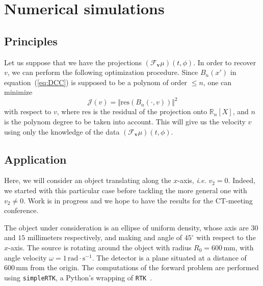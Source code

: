 \documentclass[twocolumn]{IEEEtran}
\numberwithin{equation}{section}
\newcommand{\R}{\mathbb{R}}
\newcommand{\ie}{\emph{i.e.} }
\newcommand{\Tbv}{\mathcal{F}_{\mathbf{v}}}
\begin{document}
\section{Numerical simulations}

\subsection{Principles}
\label{sub:principles}
Let us suppose that we have the projections $\left( \Tbv \mu \right)(t,\phi)$. In order to recover $v$, we can perform the following optimization procedure. Since $B_n(x')$ in equation~(\ref{eq:DCC}) is supposed to be a polynom of order $\leq n$, one can minimize
\begin{equation}
	\mathcal{J}(v) = \Vert \textrm{res} \left( B_n(\cdot,v) \right) \Vert^2
\label{eq:Jv}
\end{equation}
with respect to $v$, where $\textrm{res}$ is the residual of the projection onto $\R_n[X]$, and $n$ is the polynom degree to be taken into account. This will give us the velocity $v$ using only the knowledge of the data $\left( \Tbv \mu \right)(t,\phi)$.

\subsection{Application}
\label{sub:application}
Here, we will consider an object translating along the $x$-axis, \ie $v_2=0$. Indeed, we started with this particular case before tackling the more general one with $v_2 \neq 0$. Work is in progress and we hope to have the results for the CT-meeting conference. 

The object under consideration is an ellipse of uniform density, whose axis are $30$ and $15$ millimeters respectively, and making and angle of $45^{\circ}$ with respect to the $x$-axis. The source is rotating around the object with radius $R_0 = 600 \, \textrm{mm}$, with angle velocity $\omega = 1 \, \textrm{rad} \cdot \textrm{s}^{-1}$. The detector is a plane situated at a distance of $600 \, \textrm{mm}$ from the origin. The computations of the forward problem are performed using \verb+simpleRTK+, a Python's wrapping of \verb+RTK+~\cite{RTK}.
\end{document}

